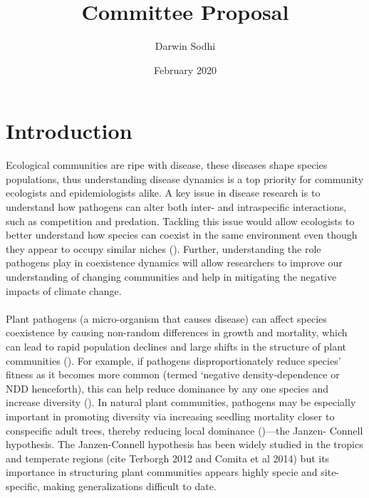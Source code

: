 \documentclass{article}
\title{Committee Proposal}
\author{Darwin Sodhi}
\date{February 2020}
\begin{document}
\maketitle

\section{Introduction}

Ecological communities are ripe with disease, these diseases shape species populations, thus understanding disease dynamics is a top priority for community ecologists and epidemiologists alike. A key issue in disease research is to understand how pathogens can alter both inter- and intraspecific interactions, such as competition and predation. Tackling this issue would allow ecologists to better understand how species can coexist in the same environment even though they appear to occupy similar niches (\citep{Freckleton2006}). Further, understanding the role pathogens play in coexistence dynamics will allow researchers to improve our understanding of changing communities and help in mitigating the negative impacts of climate change.  

\paragraph{}Plant pathogens (a micro-organism that causes disease) can affect species coexistence by causing non-random differences in growth and mortality, which can lead to rapid population declines and large shifts in the structure of plant communities (\citep{Gilbert2002}). For example, if pathogens disproportionately reduce species’ fitness as it becomes more common (termed ‘negative density-dependence or NDD henceforth), this can help reduce dominance by any one species and increase diversity (\citep{Chesson2000}). In natural plant communities, pathogens may be especially important in promoting diversity via increasing seedling mortality closer to conspecific adult trees, thereby reducing local dominance (\citep{HilleRisLambers2012})—the Janzen- Connell hypothesis. The Janzen-Connell hypothesis has been widely studied in the tropics and temperate regions (cite Terborgh 2012 and Comita et al 2014) but its importance in structuring plant communities appears highly specie and site-specific, making generalizations difficult to date.  
\end{document}

